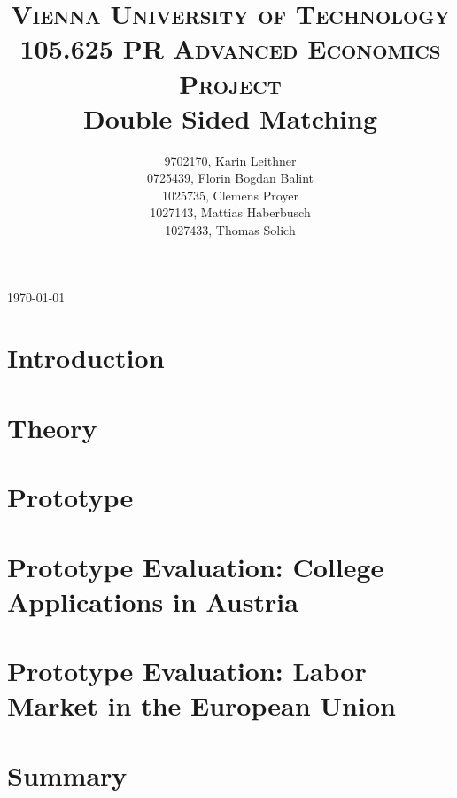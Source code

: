 \documentclass[11pt,english]{article}
\title{
	\usefont{OT1}{bch}{b}{n}
	\normalfont \normalsize \textsc{Vienna University of Technology} \\ [25pt]
	\normalfont \normalsize \textsc{105.625 PR Advanced Economics Project} \\ [25pt]
	\huge Double Sided Matching
}
\author{
  9702170, Karin Leithner\\
  0725439, Florin Bogdan Balint\\
  1025735, Clemens Proyer\\
  1027143, Mattias Haberbusch\\
  1027433, Thomas Solich\\
}
\numberwithin{equation}{section}%
\numberwithin{figure}{section}%
\numberwithin{table}{section}%
\begin{document}
\begin{titlepage}
	\begin{center}
		\thetitle
		\vspace{2cm}
	\end{center}
	\begin{flushleft}
	\vfill
	\theauthor
	\end{flushleft}
	\begin{center}
		\vspace{2cm}
		{\large \today\par}
	\end{center}
\end{titlepage}

\setlength{\cftbeforesecskip}{9pt}
\tableofcontents

\newpage

\section{Introduction}


\section{Theory}


\section{Prototype}


\section{Prototype Evaluation: College Applications in Austria}


\section{Prototype Evaluation: Labor Market in the European Union}


\section{Summary}

\end{document}
